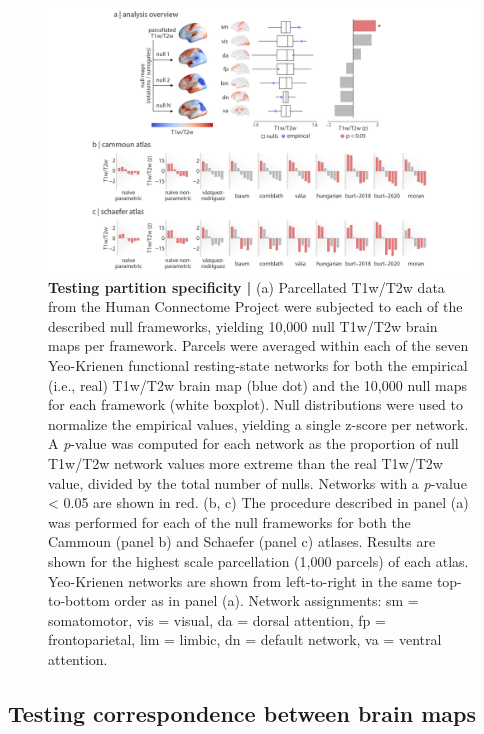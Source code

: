 \documentclass[12pt,aps,pra,reprint,showkeys]{revtex4-1}
\begin{document}
\begin{figure}[htp]
  \begin{center}
    \centerline{\includegraphics[width=\textwidth]{hcp_results.png}}
    \caption{
      \textbf{Testing partition specificity | }
      (a) Parcellated T1w/T2w data from the Human Connectome Project were subjected to each of the described null frameworks, yielding 10,000 null T1w/T2w brain maps per framework.
      Parcels were averaged within each of the seven Yeo-Krienen functional resting-state networks \citep{yeo2011organization} for both the empirical (i.e., real) T1w/T2w brain map (blue dot) and the 10,000 null maps for each framework (white boxplot).
      Null distributions were used to normalize the empirical values, yielding a single z-score per network.
      A \emph{p}-value was computed for each network as the proportion of null T1w/T2w network values more extreme than the real T1w/T2w value, divided by the total number of nulls.
      Networks with a \emph{p}-value < 0.05 are shown in red.
      (b, c) The procedure described in panel (a) was performed for each of the null frameworks for both the Cammoun (panel b) and Schaefer (panel c) atlases.
      Results are shown for the highest scale parcellation (1,000 parcels) of each atlas.
      Yeo-Krienen networks are shown from left-to-right in the same top-to-bottom order as in panel (a).
      Network assignments: sm = somatomotor, vis = visual, da = dorsal attention, fp = frontoparietal, lim = limbic, dn = default network, va = ventral attention.
      }
    \label{figure-hcp-results}
  \end{center}
\end{figure}

\subsection*{Testing correspondence between brain maps}
\end{document}
